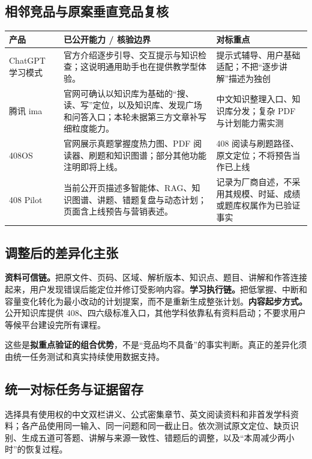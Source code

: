 \documentclass[UTF8,a4paper,11pt,fontset=none]{ctexart}
\newcommand{\cth}[1]{\textbf{\sffamily #1}}
\newenvironment{tbl}{\par\vspace{3pt}\small\noindent\ignorespaces}{\unskip\par\vspace{5pt}}
\begin{document}
\subsection{相邻竞品与原案垂直竞品复核}
\begin{tbl}
\begin{tabularx}{\linewidth}{@{}L{25mm}YY@{}}
\toprule
\cth{产品}&\cth{已公开能力 / 核验边界}&\cth{对标重点}\\\midrule
ChatGPT 学习模式&官方介绍逐步引导、交互提示与知识检查；这说明通用助手也在提供教学型体验。\cite{chatgpt}&提示式辅导、用户基础适配；不把“逐步讲解”描述为独创\\
腾讯 ima&官网可确认以知识库为基础的“搜、读、写”定位，以及知识库、发现广场和问答入口；本轮未据第三方文章补写细粒度能力。\cite{ima}&中文知识整理入口、知识库分发；复杂 PDF 与计划能力需实测\\
408OS&官网展示真题掌握度热力图、PDF 阅读器、刷题和知识图谱；部分其他功能注明即将上线。\cite{os408}&408 阅读与刷题路径、原文定位；不将预告当作已上线\\
408 Pilot&当前公开页描述多智能体、RAG、知识图谱、讲题、错题复盘与动态计划；页面含上线预告与营销表述。\cite{pilot408}&记录为厂商自述，不采用其规模、时延、成绩或题库权属作为已验证事实\\
\bottomrule
\end{tabularx}
\end{tbl}

\subsection{调整后的差异化主张}
\textbf{资料可信链。}把原文件、页码、区域、解析版本、知识点、题目、讲解和作答连接起来，用户发现错误后能定位并修订受影响内容。\textbf{学习执行链。}把低掌握、中断和容量变化转化为最小改动的计划提案，而不是重新生成整张计划。\textbf{内容起步方式。}公开知识库提供 408、四六级标准入口，其他学科依靠私有资料启动；不要求用户等候平台建设完所有课程。

这些是\textbf{拟重点验证的组合优势}，不是“竞品均不具备”的事实判断。真正的差异化须由统一任务测试和真实持续使用数据支持。

\subsection{统一对标任务与证据留存}
选择具有使用权的中文双栏讲义、公式密集章节、英文阅读资料和非首发学科资料；各产品使用同一输入、同一问题和同一截止日。依次测试原文定位、缺页识别、生成五道可答题、讲解与来源一致性、错题后的调整，以及“本周减少两小时”的恢复过程。
\end{document}

